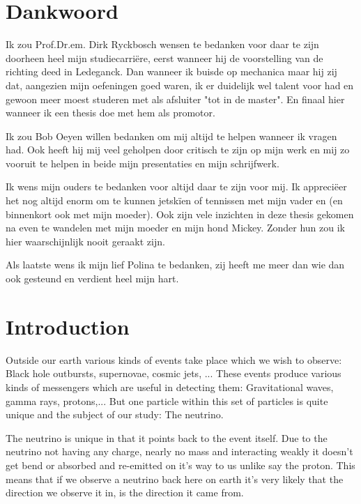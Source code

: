\documentclass[11pt,a4paper,faculty=we,language=en,doctype=report]{cls/ugent-doc}
\begin{document}
\chapter*{Dankwoord}
Ik zou Prof.Dr.em. Dirk Ryckbosch wensen te bedanken voor daar te
zijn doorheen heel mijn studiecarriëre, eerst wanneer hij de
voorstelling van de richting deed in Ledeganck. Dan wanneer ik
buisde op mechanica maar hij zij dat, aangezien mijn oefeningen goed
waren, ik er duidelijk wel talent voor had en gewoon meer moest
studeren met als afsluiter "tot in de master". En finaal hier
wanneer ik een thesis doe met hem als promotor.

Ik zou Bob Oeyen willen bedanken om mij altijd te helpen wanneer ik
vragen had. Ook heeft hij mij veel geholpen door critisch te zijn op
mijn werk en mij zo vooruit te helpen in beide mijn presentaties en
mijn schrijfwerk.

Ik wens mijn ouders te bedanken voor altijd daar te zijn voor mij.
Ik appreciëer het nog altijd enorm om te kunnen jetskïen of
tennissen met mijn vader en (en binnenkort ook met mijn moeder).
Ook zijn vele inzichten in deze thesis gekomen na even te wandelen
met mijn moeder en mijn hond Mickey.  Zonder hun zou ik hier
waarschijnlijk nooit geraakt zijn.

Als laatste wens ik mijn lief Polina te bedanken, zij heeft me
meer dan wie dan ook gesteund en verdient heel mijn hart.
\newpage
{\hypersetup{hidelinks}\tableofcontents} %
\newpage


\chapter*{Introduction}
Outside our earth various kinds of events take place which we wish to 
observe: Black hole outbursts, supernovae, cosmic jets, ...
These events produce various kinds of messengers which are useful in
detecting them: Gravitational waves, gamma rays, protons,...
But one particle within this set of particles is quite unique and
the subject of our study: The neutrino. 

The neutrino is unique in that it points back to the event itself.
Due to the neutrino not having any charge, nearly no mass and 
interacting weakly it doesn't get bend or absorbed and re-emitted 
on it's way to us unlike say the proton. This means that if we observe
a neutrino back here on earth it's very likely that the direction we observe
it in, is the direction it came from.
\end{document}
